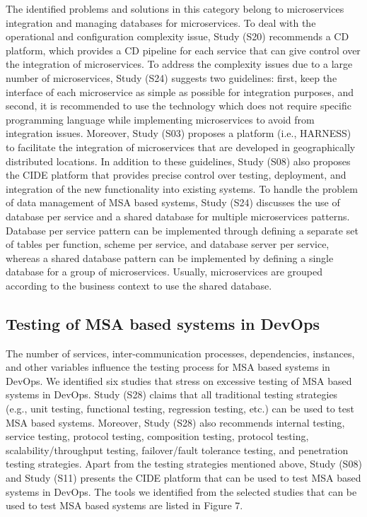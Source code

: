 The identified problems and solutions in this category belong to microservices integration and managing databases for microservices. To deal with the operational and configuration complexity issue, Study (S20) recommends a CD platform, which provides a CD pipeline for each service that can give control over the integration of microservices. To address the complexity issues due to a large number of microservices, Study (S24) suggests two guidelines: first, keep the interface of each microservice as simple as possible for integration purposes, and second, it is recommended to use the technology which does not require specific programming language while implementing microservices to avoid from integration issues. Moreover, Study (S03) proposes a platform (i.e., HARNESS) to facilitate the integration of microservices that are developed in geographically distributed locations. In addition to these guidelines, Study (S08) also proposes the CIDE platform that provides precise control over testing, deployment, and integration of the new functionality into existing systems. To handle the problem of data management of MSA based systems, Study (S24) discusses the use of database per service and a shared database for multiple microservices patterns. Database per service pattern can be implemented through defining a separate set of tables per function, scheme per service, and database server per service, whereas a shared database pattern can be implemented by defining a single database for a group of microservices. Usually, microservices are grouped according to the business context to use the shared database.

\subsection{Testing of MSA based systems in DevOps}
The number of services, inter-communication processes, dependencies, instances, and other variables influence the testing process for MSA based systems in DevOps. We identified six studies that stress on excessive testing of MSA based systems in DevOps. Study (S28) claims that all traditional testing strategies (e.g., unit testing, functional testing, regression testing, etc.) can be used to test MSA based systems. Moreover, Study (S28) also recommends internal testing, service testing, protocol testing, composition testing, protocol testing, scalability/throughput testing, failover/fault tolerance testing, and penetration testing strategies. Apart from the testing strategies mentioned above, Study (S08) and Study (S11) presents the CIDE platform that can be used to test MSA based systems in DevOps. The tools we identified from the selected studies that can be used to test MSA based systems are listed in Figure 7.

